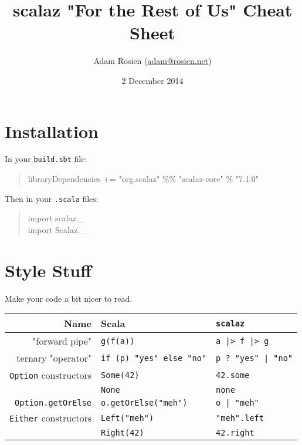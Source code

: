 \documentclass{tufte-handout}
\title{scalaz "For the Rest of Us" Cheat Sheet}
\author[Adam Rosien]{Adam Rosien (\href{mailto:adam@rosien.net}{adam@rosien.net})}
\date{2 December 2014}  %
\begin{document}
\maketitle%


\section{Installation}\label{sec:installation}

In your \texttt{build.sbt} file:

\begin{fullwidth}
\begin{quote}
  \ttfamily
   libraryDependencies += "org.scalaz" \%\% "scalaz-core" \% "7.1.0"
\end{quote}
\end{fullwidth}

\noindent Then in your \texttt{.scala} files: 

\begin{quote}
  \ttfamily import scalaz.\_\\
  import Scalaz.\_
\end{quote}

\section{Style Stuff}\label{sec:style}

Make your code a bit nicer to read.

\begin{table}[ht]
  \centering
  \selectfont
  \begin{tabular}{rll}
    \toprule
    Name & Scala & \texttt{scalaz} \\
    \midrule
    "forward pipe"& \texttt{g(f(a))} & \texttt{a |> f |> g}  \\
    ternary "operator" & \texttt{if (p) "yes" else "no"} & \texttt{p ? "yes" | "no"} \\
    \texttt{Option} constructors & \texttt{Some(42)} & \texttt{42.some} \\
                                   & \texttt{None} & \texttt{none} \\
    \texttt{Option.getOrElse} & \texttt{o.getOrElse("meh")} & \texttt{o | "meh"} \\
    \texttt{Either} constructors & \texttt{Left("meh")} & \texttt{"meh".left} \\
                                  & \texttt{Right(42)} & \texttt{42.right} \\
    \bottomrule
  \end{tabular}
  \label{tab:normaltab}
\end{table}
\end{document}
